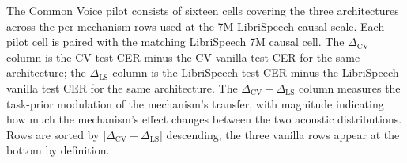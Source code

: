 The Common Voice pilot consists of sixteen cells covering the three
architectures across the per-mechanism rows used at the 7M
LibriSpeech causal scale. Each pilot cell is paired with the
matching LibriSpeech 7M causal cell. The
$\Delta_{\mathrm{CV}}$ column is the CV test CER minus the CV
vanilla test CER for the same architecture; the
$\Delta_{\mathrm{LS}}$ column is the LibriSpeech test CER minus the
LibriSpeech vanilla test CER for the same architecture. The
$\Delta_{\mathrm{CV}} - \Delta_{\mathrm{LS}}$ column measures the
task-prior modulation of the mechanism's transfer, with magnitude
indicating how much the mechanism's effect changes between the two
acoustic distributions. Rows are sorted by
$|\Delta_{\mathrm{CV}} - \Delta_{\mathrm{LS}}|$ descending; the
three vanilla rows appear at the bottom by definition.

